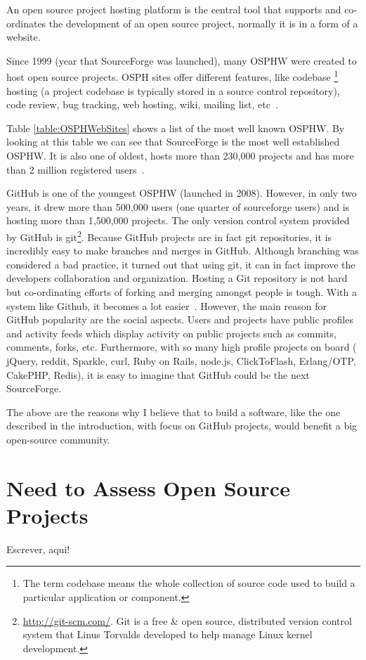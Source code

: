 An open source project hosting platform is the central tool that supports and co-ordinates the development of an open source project,
 normally it is in a form of a website.

Since 1999 (year that SourceForge was launched), many OSPHW were created to host open source projects.
OSPH sites offer different features, 
like codebase \footnote{The term codebase means the whole collection of source code used to build a particular application or component.} 
hosting (a project codebase is typically stored in a source control repository), 
code review, bug tracking, web hosting, wiki, mailing list, etc~\cite{binkley2006animated}.

Table \ref{table:OSPHWebSites} shows a list of the most well known OSPHW.
By looking at this table we can see that SourceForge is the most well established OSPHW.
It is also one of oldest, 
hosts more than 230,000 projects and has more than 2 million registered users~\cite{christley2005collection}.

GitHub is one of the youngest OSPHW (launched in 2008). 
However, in only two years, it drew more than 500,000 users (one quarter of sourceforge users) and is hosting more than 1,500,000 projects. 
The only version control system provided by GitHub is 
git\footnote{\url{http://git-scm.com/}. 
  Git is a free \& open source, distributed version control system that Linus Torvalds developed to help manage Linux kernel development.
}.
Because GitHub projects are in fact git repositories, 
it is incredibly easy to make branches and merges in GitHub. 
Although branching was considered a bad practice, 
it turned out that using git, it can in fact improve the developers collaboration and organization.
Hosting a Git repository is not hard but co-ordinating efforts of forking and merging amongst people is tough. 
With a system like Github, it becomes a lot easier~\cite{petercooper2010}.
However, the main reason for GitHub popularity are the social aspects.
Users and projects have public profiles and activity feeds which display activity on public projects such as commits, comments, forks, etc.
Furthermore, with so many high profile projects on board (
jQuery, 
reddit, 
Sparkle, 
curl, 
Ruby on Rails, 
node.js, 
ClickToFlash, 
Erlang/OTP, 
CakePHP, 
Redis), 
it is easy to imagine that GitHub could be the next SourceForge.

The above are the reasons why I believe that to build a software, like the one described in the introduction, with focus on GitHub projects, would benefit a big open-source community. 

\section{Need to Assess Open Source Projects}

Escrever, aqui!

